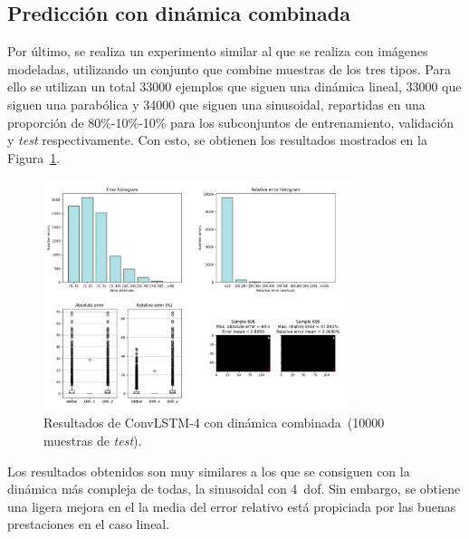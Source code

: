 \subsection{Predicción con dinámica combinada}
Por último, se realiza un experimento similar al que se realiza con imágenes modeladas, utilizando un conjunto que combine muestras de los tres tipos. Para ello se utilizan un total 33000 ejemplos que siguen una dinámica lineal, 33000 que siguen una parabólica y 34000 que siguen una sinusoidal, repartidas en una proporción de 80\%-10\%-10\% para los subconjuntos de entrenamiento, validación y \textit{test} respectivamente. Con esto, se obtienen los resultados mostrados en la Figura~\ref{fig.raw_convlstm4_mix_100000}.
\begin{figure}[H]
		\begin{center}
			\includegraphics[width=0.8\textwidth]{ figures/test_raw/REC/ConvLSTM_complex/mix_100000.png}
			\caption{Resultados de ConvLSTM-4 con dinámica combinada~(10000 muestras de \textit{test}).}
			\label{fig.raw_convlstm4_mix_100000}
		\end{center}
\end{figure}
\vspace{-10pt}

Los resultados obtenidos son muy similares a los que se consiguen con la dinámica más compleja de todas, la sinusoidal con 4~\acrshort{dof}. Sin embargo, se obtiene una ligera mejora en el la media del error relativo está propiciada por las buenas prestaciones en el caso lineal.


